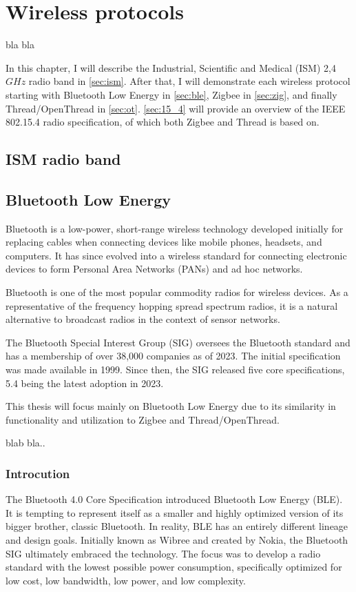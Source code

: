 \chapter{Wireless protocols}
\label{chap:wireless}

bla bla

In this chapter, I will describe the Industrial, Scientific and Medical (ISM) 2,4 \(GHz\) radio band in \autoref{sec:ism}.
After that, I will demonstrate each wireless protocol starting with Bluetooth Low Energy in \autoref{sec:ble},
Zigbee in \autoref{sec:zig}, and finally Thread/OpenThread in \autoref{sec:ot}.
\autoref{sec:15_4} will provide an overview of the IEEE 802.15.4 radio specification, of which both Zigbee and Thread is based on.

\section{ISM radio band}
\label{sec:ism}

\section{Bluetooth Low Energy}
\label{sec:ble}

Bluetooth is a low-power, short-range wireless technology developed initially for replacing cables when
connecting devices like mobile phones, headsets, and computers.
It has since evolved into a wireless standard for connecting electronic devices to
form Personal Area Networks (PANs) and ad hoc networks. \cite{Dideles03}

Bluetooth is one of the most popular commodity radios for wireless devices.
As a representative of the frequency hopping spread spectrum radios,
it is a natural alternative to broadcast radios in the context of sensor networks. \cite{Leopold03}

The Bluetooth Special Interest Group (SIG) oversees
the Bluetooth standard and has a membership of over 38,000 companies as of 2023. \cite{bt_history}
The initial specification was made available in 1999.
Since then, the SIG released five core specifications, 5.4 being the latest adoption in 2023. \cite{bt_spec_history}

This thesis will focus mainly on Bluetooth Low Energy due to
its similarity in functionality and utilization to Zigbee and Thread/OpenThread.

blab bla.\cite{ble_primer23}.

\subsection{Introcution}
\label{ble:int}
The Bluetooth 4.0 Core Specification introduced Bluetooth Low Energy (BLE).
It is tempting to represent itself as a smaller and highly optimized version of
its bigger brother, classic Bluetooth. In reality, BLE has an entirely different lineage and design goals.
Initially known as Wibree and created by Nokia, the Bluetooth SIG ultimately embraced the technology.
The focus was to develop a radio standard with the lowest possible power consumption,
specifically optimized for low cost, low bandwidth, low power, and low complexity. \cite{Townsend14}

